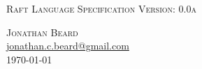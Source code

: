 \documentclass[11pt, letterpaper, notitlepage]{report}
\begin{document}
\begin{center}
\begin{minipage}{.5\textwidth}
\begin{flushleft}
\textsc{Raft Language Specification}
\textsc{Version: 0.0a}
\end{flushleft}
\end{minipage}
\begin{minipage}{.4\textwidth}
\begin{flushright}
\textsc{Jonathan Beard\\}
\href{mailto:jonathan.c.beard@gmail.com}{jonathan.c.beard@gmail.com}\\
\today
\end{flushright}
\end{minipage}

\end{center}

\hrulefill
%

%
%
%
%
%
%
%
%
%
%
%
\end{document}
